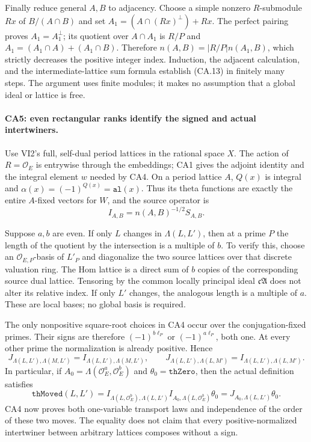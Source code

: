Finally reduce general $A,B$ to adjacency. Choose a simple nonzero
$R$-submodule $Rx$ of $B/(A\cap B)$ and set
$A_1=(A\cap(Rx)^\perp)+Rx$. The perfect pairing proves
$A_1=A_1^\perp$; its quotient over $A\cap A_1$ is $R/P$ and
$A_1=(A_1\cap A)+(A_1\cap B)$. Therefore
$n(A,B)=|R/P|n(A_1,B)$, which strictly decreases the positive
integer index. Induction, the adjacent calculation, and the
intermediate-lattice sum formula establish (CA.13) in finitely many
steps. The argument uses finite modules; it makes no assumption
that a global ideal or lattice is free.

\paragraph{CA5: even rectangular ranks identify the signed and actual intertwiners.}
Use VI2's full, self-dual period lattices in the rational space $X$.
The action of $R=\mathcal O_E$ is entrywise through the embeddings;
CA1 gives the adjoint identity and the integral element $w$ needed
by CA4. On a period lattice $A$, $Q(x)$ is integral and
$\alpha(x)=(-1)^{Q(x)}=\texttt{al}(x)$. Thus its theta functions
are exactly the entire $A$-fixed vectors for $W$, and the source
operator is
\[
 I_{A,B}=n(A,B)^{-1/2}S_{A,B}.
 \tag{CA.14}
\]

Suppose $a,b$ are even. If only $L$ changes in $\Lambda(L,L')$,
then at a prime $P$ the length of the quotient by the intersection
is a multiple of $b$. To verify this, choose an
$\mathcal O_{E,P}$-basis of $L'_P$ and diagonalize the two source
lattices over that discrete valuation ring. The Hom lattice is a
direct sum of $b$ copies of the corresponding source dual lattice.
Tensoring by the common locally principal ideal
$\mathfrak c\mathfrak A$ does not alter its relative index.
If only $L'$ changes, the analogous length is a multiple of $a$.
These are local bases; no global basis is required.

The only nonpositive square-root choices in CA4 occur over the
conjugation-fixed primes. Their signs are therefore
$(-1)^{b\ell_P}$ or $(-1)^{a\ell_P}$, both one. At every other
prime the normalization is already positive. Hence
\[
 J_{\Lambda(L,L'),\Lambda(M,L')}=I_{\Lambda(L,L'),\Lambda(M,L')},
 \qquad
 J_{\Lambda(L,L'),\Lambda(L,M')}=I_{\Lambda(L,L'),\Lambda(L,M')}.
 \tag{CA.15}
\]
In particular, if $A_0=\Lambda(\mathcal O_E^a,\mathcal O_E^b)$
and $\theta_0=\texttt{thZero}$, then the actual definition satisfies
\[
 \texttt{thMoved}(L,L')
   =I_{\Lambda(L,\mathcal O_E^b),\Lambda(L,L')}
      I_{A_0,\Lambda(L,\mathcal O_E^b)}\theta_0
   =J_{A_0,\Lambda(L,L')}\theta_0.
 \tag{CA.16}
\]
CA4 now proves both one-variable transport laws and independence of
the order of these two moves. The equality does not claim that
every positive-normalized intertwiner between arbitrary lattices
composes without a sign.

